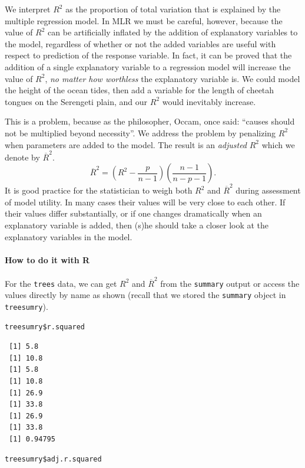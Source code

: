 \documentclass[captions=tableheading]{scrbook}
\begin{document}
We interpret \(R^{2}\) as the proportion of total variation that is explained by the multiple regression model. In MLR we must be careful, however, because the value of \(R^{2}\) can be artificially inflated by the addition of explanatory variables to the model, regardless of whether or not the added variables are useful with respect to prediction of the response variable. In fact, it can be proved that the addition of a single explanatory variable to a regression model will increase the value of \(R^{2}\), \emph{no matter how worthless} the explanatory variable is. We could model the height of the ocean tides, then add a variable for the length of cheetah tongues on the Serengeti plain, and our \(R^{2}\) would inevitably increase. 

This is a problem, because as the philosopher, Occam, once said: ``causes should not be multiplied beyond necessity''. We address the problem by penalizing \(R^{2}\) when parameters are added to the model. The result is an \emph{adjusted} \(R^{2}\) which we denote by \(\overline{R}^{2}\).
\begin{equation}
\overline{R}^{2}=\left(R^{2}-\frac{p}{n-1}\right)\left(\frac{n-1}{n-p-1}\right).
\end{equation}
It is good practice for the statistician to weigh both \(R^{2}\) and \(\overline{R}^{2}\) during assessment of model utility. In many cases their values will be very close to each other. If their values differ substantially, or if one changes dramatically when an explanatory variable is added, then (s)he should take a closer look at the explanatory variables in the model.

\paragraph*{How to do it with \textsf{R}}
For the \texttt{trees} data, we can get \(R^{2}\) and \(\overline{R}^{2}\) from the \texttt{summary} output or access the values directly by name as shown (recall that we stored the \texttt{summary} object in \texttt{treesumry}).


\begin{verbatim}
treesumry$r.squared
\end{verbatim}

\begin{verbatim}
 [1] 5.8
 [1] 10.8
 [1] 5.8
 [1] 10.8
 [1] 26.9
 [1] 33.8
 [1] 26.9
 [1] 33.8
 [1] 0.94795
\end{verbatim}


\begin{verbatim}
treesumry$adj.r.squared
\end{verbatim}
\end{document}
